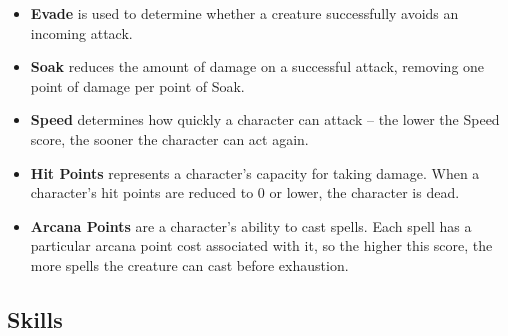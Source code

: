 \begin{itemize}
\item {\bf Evade} is used to determine whether a creature successfully
avoids an incoming attack.

\item {\bf Soak} reduces the amount of damage on a successful attack,
removing one point of damage per point of Soak.

\item {\bf Speed} determines how quickly a character can attack -- the
lower the Speed score, the sooner the character can act again.

\item {\bf Hit Points} represents a character's capacity for taking damage.
When a character's hit points are reduced to 0 or lower, the character is
dead.

\item {\bf Arcana Points} are a character's ability to cast spells.  Each
spell has a particular arcana point cost associated with it, so the higher
this score, the more spells the creature can cast before exhaustion.
\end{itemize}

\subsection{Skills}

